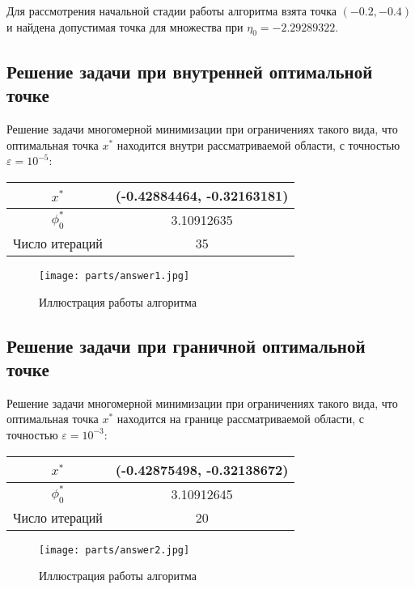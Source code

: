 \documentclass[../body.tex]{subfiles}
\begin{document}
Для рассмотрения начальной стадии работы алгоритма взята точка $(-0.2,-0.4)$ и найдена допустимая точка для множества при $\eta_0=-2.29289322$.

\subsection{Решение задачи при внутренней оптимальной точке}
Решение задачи многомерной минимизации при ограничениях такого вида, что оптимальная точка $x^*$ находится внутри рассматриваемой области, с точностью $\varepsilon=10^{-5}$:
\begin{table}[H]
    \centering
    \begin{tabular}{|c|c|}
        \hline
        $x^*$ & (-0.42884464, -0.32163181)\\\hline
        $\phi_0^*$ & 3.10912635\\\hline
        Число итераций & 35\\\hline
    \end{tabular}
\end{table}

\begin{figure}[H]
    \centering
    \texttt{[image: parts/answer1.jpg]}
    \caption{Иллюстрация работы алгоритма}
\end{figure}

\subsection{Решение задачи при граничной оптимальной точке}
Решение задачи многомерной минимизации при ограничениях такого вида, что оптимальная точка $x^*$ находится на границе рассматриваемой области, с точностью $\varepsilon=10^{-3}$:
\begin{table}[H]
    \centering
    \begin{tabular}{|c|c|}
        \hline
        $x^*$ & (-0.42875498, -0.32138672)\\\hline
        $\phi_0^*$ & 3.10912645\\\hline
        Число итераций & 20\\\hline
    \end{tabular}
\end{table}

\begin{figure}[H]
    \centering
    \texttt{[image: parts/answer2.jpg]}
    \caption{Иллюстрация работы алгоритма}
\end{figure}
\end{document}
